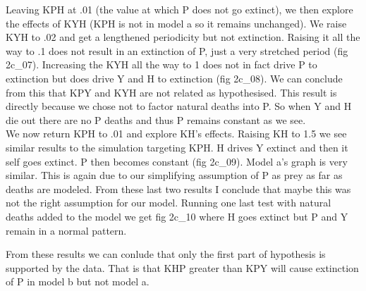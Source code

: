 \documentclass{article}
\begin{document}
Leaving KPH at .01 (the value at which P does not go extinct), we then explore the effects of
KYH (KPH is not in model a so it remains unchanged).  We raise KYH to .02 and get a lengthened periodicity but not extinction. Raising it all
the way to .1 does not result in an extinction of P, just a very stretched period (fig 2c\_07).
Increasing the KYH all the way to 1 does not in fact drive P to extinction but does drive
Y and H to extinction (fig 2c\_08). We can conclude from this that KPY and KYH are not
related as hypothesised. This result is directly because we chose not to factor natural
deaths into P. So when Y and H die out there are no P deaths and thus P remains constant
as we see.\\

We now return KPH to .01 and explore KH's effects. Raising KH to 1.5 we see similar results
to the simulation targeting KPH. H drives Y extinct and then it self goes extinct. P then
becomes constant (fig 2c\_09). Model a's graph is very similar.  This is again due to our simplifying assumption of P as prey as far
as deaths are modeled. From these last two results I conclude that maybe this was not
the right assumption for our model. Running one last test with natural deaths added to
the model we get fig 2c\_10 where H goes extinct but P and Y remain in a normal pattern.

From these results we can conlude that only the first part of hypothesis is supported by the
data. That is that KHP greater than KPY will cause extinction of P in model b but not
model a.

\pagebreak
\end{document}
